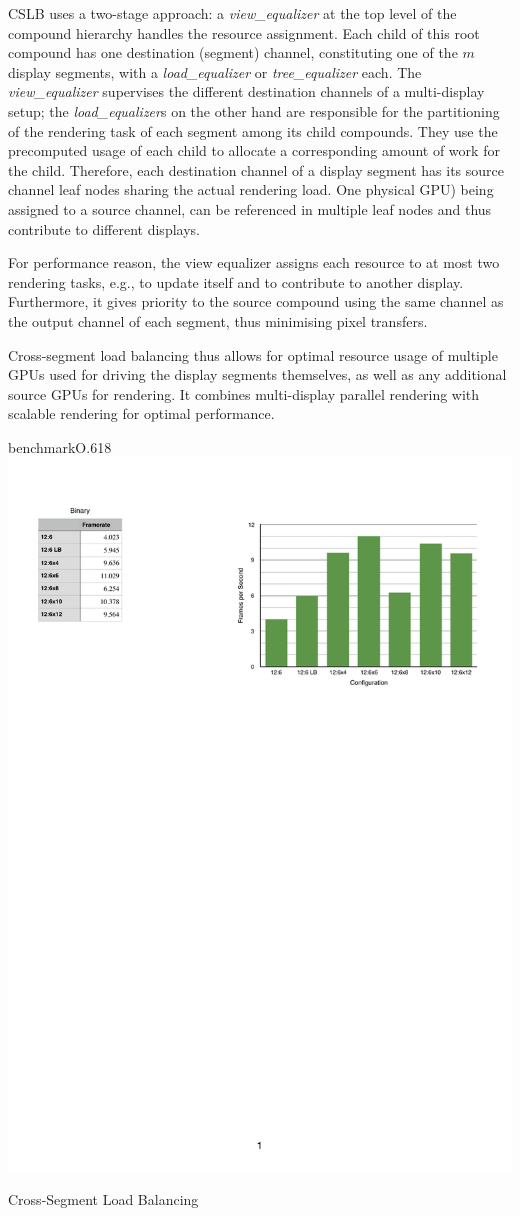 CSLB uses a two-stage approach: a {\em view\_equalizer} at the top level of the
compound hierarchy handles the resource assignment. Each child of this root
compound has one destination (segment) channel, constituting one of the $m$
display segments, with a {\em load\_equalizer} or {\em tree\_equalizer} each.
The {\em view\_equalizer} supervises the different destination channels of a
multi-display setup; the {\em load\_equalizer}s on the other hand are
responsible for the partitioning of the rendering task of each segment among
its child compounds. They use the precomputed usage of each child to allocate a
corresponding amount of work for the child. Therefore, each destination channel
of a display segment has its source channel leaf nodes sharing the actual
rendering load. One physical GPU) being assigned to a source channel, can be
referenced in multiple leaf nodes and thus contribute to different displays.

For performance reason, the view equalizer assigns each resource to at most two
rendering tasks, e.g., to update itself and to contribute to another display.
Furthermore, it gives priority to the source compound using the same channel as
the output channel of each segment, thus minimising pixel transfers.

Cross-segment load balancing thus allows for optimal resource usage of multiple
GPUs used for driving the display segments themselves, as well as any additional
source GPUs for rendering. It combines multi-display parallel rendering with
scalable rendering for optimal performance.

\begin{wrapfloat}{benchmark}{O}{.618\textwidth}
  \includegraphics[width=.618\textwidth]{results/cslbFPS}
  \caption{\label{rCSLBFPS}Cross-Segment Load Balancing}
\end{wrapfloat}

